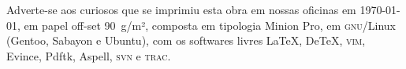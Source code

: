 \pagebreak
\ifodd\thepage\blank\else\relax\fi

\thispagestyle{empty}
\mbox{}\vfill

\begin{adjustwidth}{.15\textwidth}{.15\textwidth}
{\noindent\centering\footnotesize
Adverte-se aos curiosos que se imprimiu esta obra em nossas oficinas em \today,
em papel \mbox{off-set} 90~g/m², composta em tipologia Minion Pro, em
\textsc{gnu}/Linux (Gentoo, Sabayon e Ubuntu), com os softwares livres \LaTeX,
De\TeX, \textsc{vim}, Evince, Pdftk, Aspell, \textsc{svn} e \textsc{trac}.\par}
\end{adjustwidth}

